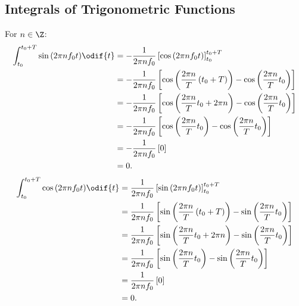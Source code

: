 \documentclass{article}
\begin{document}
\subsection{Integrals of Trigonometric Functions}
For \(n \in \Z\):
\begin{align*}
    \int_{t_0}^{t_0 + T} \sin{\left( 2\pi n f_0 t \right)} \odif{t} & = - \frac{1}{2\pi n f_0} \left[ \cos{\left( 2\pi n f_0 t \right)} \right]_{t_0}^{t_0 + T}                                                        \\
                                                                    & = - \frac{1}{2\pi n f_0} \left[ \cos{\left( \frac{2\pi n}{T} \left( t_0 + T \right) \right)} - \cos{\left( \frac{2\pi n}{T} t_0 \right)} \right] \\
                                                                    & = - \frac{1}{2\pi n f_0} \left[ \cos{\left( \frac{2\pi n}{T} t_0 + 2\pi n \right)} - \cos{\left( \frac{2\pi n}{T} t_0 \right)} \right]           \\
                                                                    & = - \frac{1}{2\pi n f_0} \left[ \cos{\left( \frac{2\pi n}{T} t_0 \right)} - \cos{\left( \frac{2\pi n}{T} t_0 \right)} \right]                    \\
                                                                    & = - \frac{1}{2\pi n f_0} \left[ 0 \right]                                                                                                        \\
                                                                    & = 0.
\end{align*}
\begin{align*}
    \int_{t_0}^{t_0 + T} \cos{\left( 2\pi n f_0 t \right)} \odif{t} & = \frac{1}{2\pi n f_0} \left[ \sin{\left( 2\pi n f_0 t \right)} \right]_{t_0}^{t_0 + T}                                                        \\
                                                                    & = \frac{1}{2\pi n f_0} \left[ \sin{\left( \frac{2\pi n}{T} \left( t_0 + T \right) \right)} - \sin{\left( \frac{2\pi n}{T} t_0 \right)} \right] \\
                                                                    & = \frac{1}{2\pi n f_0} \left[ \sin{\left( \frac{2\pi n}{T} t_0 + 2\pi n \right)} - \sin{\left( \frac{2\pi n}{T} t_0 \right)} \right]           \\
                                                                    & = \frac{1}{2\pi n f_0} \left[ \sin{\left( \frac{2\pi n}{T} t_0 \right)} - \sin{\left( \frac{2\pi n}{T} t_0 \right)} \right]                    \\
                                                                    & = \frac{1}{2\pi n f_0} \left[ 0 \right]                                                                                                        \\
                                                                    & = 0.
\end{align*}
\end{document}
